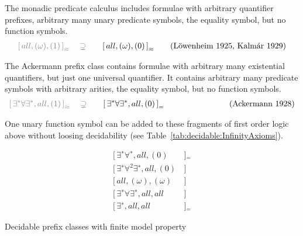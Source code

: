 \begin{example}\label{ex:monadic}
	The monadic predicate calculus includes formulae with arbitrary quantifier prefixes,
	arbitrary many unary predicate symbols, the equality symbol, but no function symbols.
	\begin{gather*}
	{\colG {[\,all, (\omega), (1)\,]}_{\mEQ}
	\quad\supsetneq}\qquad
	{[\,all, (\omega), (0 ) \,]}_{\mEQ}
	\tag{Löwenheim 1925, Kalmár 1929}
	\end{gather*}
\end{example}

\begin{example}\label{ex:ackermann}
	The Ackermann prefix class contains formulae with arbitrary many existential quantifiers,
	but just one universal quantifier. It contains arbitrary many predicate symbols
	with arbitrary arities, the equality symbol, but no function symbols.
	\begin{gather*}
	{\colG {[\,\exists^*\forall\exists^*,all,(1)\,]}_{\mEQ}
	\quad\supsetneq}\qquad
	{[\,\exists^*\forall\exists^*,all,(0) \,]}_{=}\qquad\qquad\qquad
	\tag{Ackermann 1928}
	\end{gather*}
\end{example}

\begin{remark}
	One unary function symbol can be added to these fragments of first order logic above
	without loosing decidability (see Table~\vref{tab:decidable:InfinityAxioms}).
\end{remark}


\begin{table}[hbt]
	\begin{align*}
	[ \, \exists^{∗}\forall^{∗}, all, (0)& \, ]{}_{=} \tag{Bernays, Schönfinkel 1928, Ramsey 1932}
	\\
	[\,\exists^{∗}\forall^2\exists^{∗} , all, (0)&\,] \tag{Gödel 1932, Kalmár 1933, Schütte 1934}
	\\
	[\,all, (\omega), (\omega)&\,] \tag{Löb 1967, Gurevich 1969}
	\\
	[\,\exists^{∗}\forall\exists^{∗}, all, all&\,] \tag{Gurevich 1973}
	\\
	[\,\exists^{∗}, all, all& \, ]{}_{=} \tag{Gurevich 1976}
	\end{align*}
	\caption[Decidable prefix classes (finite)]{Decidable prefix classes with finite model property}\label{tab:decidedable:FiniteModelProperty}
\end{table}

